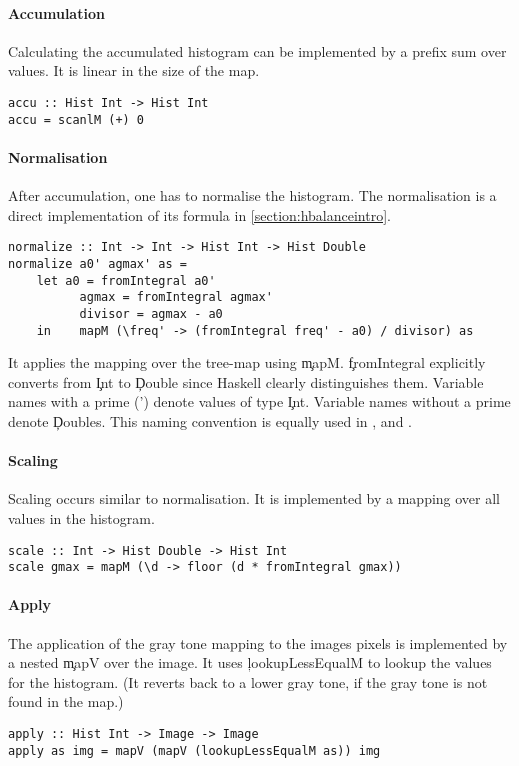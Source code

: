   \paragraph{Accumulation}
  Calculating the accumulated histogram can be implemented by
  a prefix sum over values. It is linear in the size of the map.
  \begin{lstlisting}
accu :: Hist Int -> Hist Int
accu = scanlM (+) 0
  \end{lstlisting}
    
  \paragraph{Normalisation}
  After accumulation, one has to normalise the histogram.
  The normalisation is a direct implementation of its formula in
  \ref{section:hbalanceintro}.
  \begin{lstlisting}
normalize :: Int -> Int -> Hist Int -> Hist Double
normalize a0' agmax' as =
    let a0 = fromIntegral a0'
          agmax = fromIntegral agmax'
          divisor = agmax - a0
    in    mapM (\freq' -> (fromIntegral freq' - a0) / divisor) as
  \end{lstlisting}
  It applies the mapping over the tree-map using \c{mapM}.
  \c{fromIntegral} explicitly converts from \c{Int} to \c{Double} since
  Haskell clearly distinguishes them. Variable names with a prime
  (') denote values of type \c{Int}. Variable names without a prime
  denote \c{Double}s. This naming convention is equally used in
  \man, \ndpn and \ndpv.
    
  \paragraph{Scaling}
  Scaling occurs similar to normalisation. It is implemented
  by a mapping over all values in the histogram.
  \begin{lstlisting}
scale :: Int -> Hist Double -> Hist Int
scale gmax = mapM (\d -> floor (d * fromIntegral gmax))
  \end{lstlisting}
    
  \paragraph{Apply}
  The application of the gray tone mapping to the images pixels
  is implemented by a nested \c{mapV} over the image. It uses
  \c{lookupLessEqualM} to lookup the values for the histogram.
  (It reverts back to a lower gray tone, if the gray tone is not found in the map.)
  \begin{lstlisting}
apply :: Hist Int -> Image -> Image
apply as img = mapV (mapV (lookupLessEqualM as)) img
  \end{lstlisting}
  
